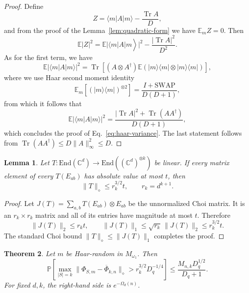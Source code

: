 \documentclass[11pt,letterpaper]{article}
\theoremstyle{plain}
\theoremstyle{plain}
\theoremstyle{plain}
\theoremstyle{plain}
\theoremstyle{plain}
\theoremstyle{plain}
\newcommand{\C}{\mathbb{C}}
\newcommand{\End}{\mathrm{End}}
\theoremstyle{plain}
\newtheorem{smtheorem}{Theorem}[section]
\newtheorem{smlemma}[smtheorem]{Lemma}
\theoremstyle{definition}
\theoremstyle{plain}
\begin{document}
\begin{proof}
Define 
\[
Z=\langle m| A|m\rangle-\frac{\operatorname{Tr} A}{D},
\]
and from the proof of the Lemma~\ref{lem:quadratic-form} we have $\mathbb{E}_m Z=0$. Then
\[
\left.\mathbb{E}|Z|^2=\mathbb{E}|\langle m| A| m\right\rangle\left.\right|^ 2-\frac{|\operatorname{Tr} A|^2}{D^2}.
\]
As for the first term, we have
\[
\mathbb{E}|\langle m| A| m\rangle\left.\right|^ 2=\operatorname{Tr}\left[\left(A \otimes A^{\dagger}\right)\mathbb{E}\left(|m\rangle\langle m| \otimes |m\rangle\langle m|\right)\right],
\]
where we use Haar second moment identity
\[
\mathbb{E}_m\left[(|m\rangle\langle m|)^{\otimes 2}\right]=\frac{I+\mathrm{SWAP}}{D(D+1)},
\]
from which it follows that
\[
   \mathbb{E}|\langle m| A| m\rangle\left.\right|^ 2= \frac{|\operatorname{Tr} A|^2+\operatorname{Tr}\left(A A^{\dagger}\right)}{D(D+1)},
\]
which concludes the proof of Eq.~\eqref{eq:haar-variance}. The last statement follows from $\operatorname{Tr}\left(A A^{\dagger}\right) \leq D\|A\|_{\infty}^{2} \leq D$.
\end{proof}

\begin{smlemma}
\label{lem:entry-to-diamond}
Let $T:\End(\C^d)\to\End((\C^d)^{\otimes k})$ be linear.  If every matrix element of every $T(E_{ab})$ has absolute value at most $t$, then
\begin{equation}
\label{eq:entry-diamond}
  \|T\|_\diamond\le r_k^{3/2}t,
  \qquad r_k=d^{k+1}.
\end{equation}
\end{smlemma}

\begin{proof}
Let $J(T)=\sum_{a,b}T(E_{ab})\otimes E_{ab}$ be the unnormalized Choi matrix.  It is an $r_k\times r_k$ matrix and all of its entries have magnitude at most $t$.  Therefore
\[
  \|J(T)\|_2\le r_k t,
  \qquad
  \|J(T)\|_1\le\sqrt{r_k}\,\|J(T)\|_2\le r_k^{3/2}t.
\]
The standard Choi bound $\|T\|_\diamond\le\|J(T)\|_1$ completes the proof.
\end{proof}

\begin{smtheorem}
\label{thm:haar-uniform}
Let $m$ be Haar-random in $M_{\omega_1}$.  Then
\begin{equation}
\label{eq:haar-probability}
  \mathbb P\!\left[
    \max_{|S|=k}
    \|\Phi_{S,m}-\overline\Phi_{k,n}\|_\diamond
    >r_k^{3/2}D_q^{-1/4}
  \right]
  \le
  \frac{M_{n,k}D_q^{1/2}}{D_q+1}.
\end{equation}
For fixed $d,k$, the right-hand side is $e^{-\Omega_d(n)}$.
\end{smtheorem}
\end{document}
